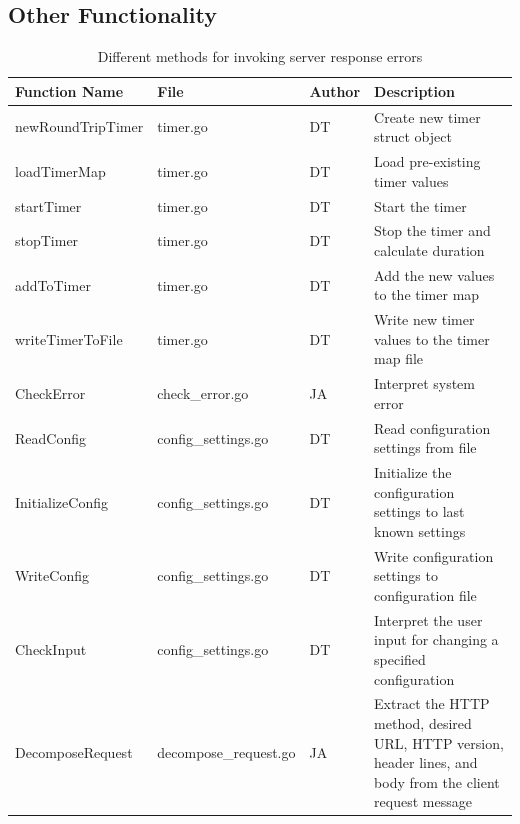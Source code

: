 \documentclass[10pt,twocolumn]{witseiepaper}
\begin{document}
		
		
		
		
	\subsection{Other Functionality}
	\label{app:other_func}
		\begin{table}[htbp]
			\centering
			\scriptsize
			\caption{Different methods for invoking server response errors}
			\label{tab:functions}
			\begin{tabular}{p{}| p{} | p{} | p{}}
				\hline
				\textbf{Function Name} & \textbf{File} & \textbf{Author} & \textbf{Description} \\ \hline
				newRoundTripTimer & timer.go & DT & Create new timer struct object \\
				loadTimerMap & timer.go & DT & Load pre-existing timer values \\
				startTimer & timer.go & DT & Start the timer \\
				stopTimer & timer.go & DT & Stop the timer and calculate duration \\
				addToTimer & timer.go & DT & Add the new values to the timer map \\
				writeTimerToFile & timer.go & DT & Write new timer values to the timer map file \\
				CheckError & check\_error.go & JA & Interpret system error \\
				ReadConfig & config\_settings.go & DT & Read configuration settings from file \\
				InitializeConfig & config\_settings.go & DT & Initialize the configuration settings to last known settings \\
				WriteConfig & config\_settings.go & DT & Write configuration settings to configuration file \\
				CheckInput & config\_settings.go & DT & Interpret the user input for changing a specified configuration \\
				DecomposeRequest & decompose\_request.go & JA & Extract the HTTP method, desired URL, HTTP version, header lines, and body from the client request message \\

\end{tabular}
\end{table}
\end{document}
